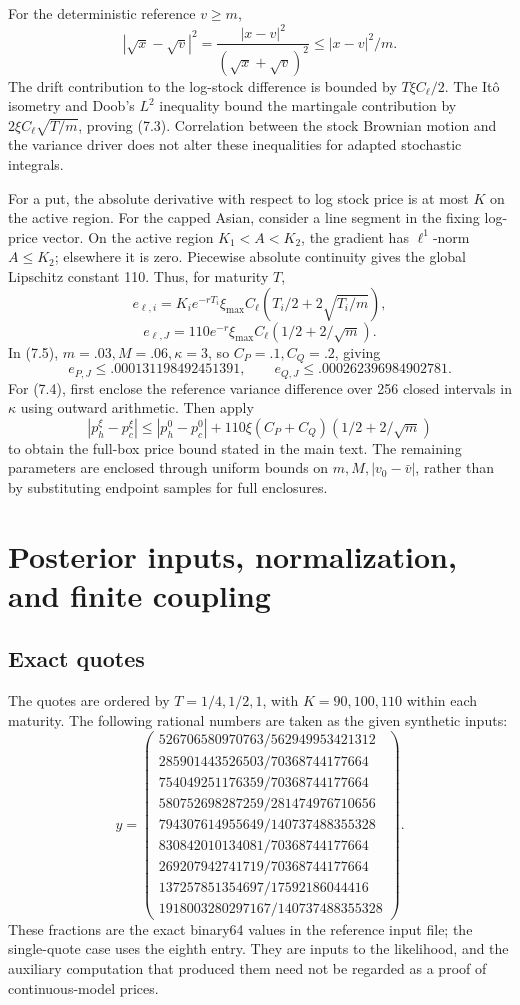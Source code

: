 For the deterministic reference \(v\ge m\),
\[
|\sqrt{x}-\sqrt v|^2
=\frac{|x-v|^2}{(\sqrt x+\sqrt v)^2}\le |x-v|^2/m.
\]
The drift contribution to the log-stock difference is bounded by \(T\xi C_\ell/2\).
The It\^o isometry and Doob's \(L^2\) inequality bound the martingale contribution by
\(2\xi C_\ell\sqrt{T/m}\), proving (7.3).
Correlation between the stock Brownian motion and the variance driver does not alter
these inequalities for adapted stochastic integrals.

For a put, the absolute derivative with respect to log stock price is at most \(K\)
on the active region.
For the capped Asian, consider a line segment in the fixing log-price vector.
On the active region \(K_1<A<K_2\), the gradient has \(\ell^1\)-norm \(A\le K_2\);
elsewhere it is zero.
Piecewise absolute continuity gives the global Lipschitz constant 110.
Thus, for maturity \(T\),
\[
e_{\ell,i}=K_i e^{-rT_i}\xi_{\max}C_\ell
\left(T_i/2+2\sqrt{T_i/m}\right),
\]
\[
e_{\ell,J}=110e^{-r}\xi_{\max}C_\ell
\left(1/2+2/\sqrt m\right).
\tag{E.3}
\]
In (7.5), \(m=.03,M=.06,\kappa=3\), so \(C_P=.1,C_Q=.2\), giving
\[
e_{P,J}\le.000131198492451391,\qquad
e_{Q,J}\le.000262396984902781.
\tag{E.4}
\]
For (7.4), first enclose the reference variance difference over 256 closed intervals
in \(\kappa\) using outward arithmetic. Then apply
\[
|p_h^\xi-p_c^\xi|
\le |p_h^0-p_c^0|+
110\xi(C_P+C_Q)(1/2+2/\sqrt m)
\]
to obtain the full-box price bound stated in the main text.
The remaining parameters are enclosed through uniform bounds on
\(m,M,|v_0-\bar v|\), rather than by substituting endpoint samples for full enclosures.

\section{Posterior inputs, normalization, and finite coupling}

\subsection{Exact quotes}

The quotes are ordered by \(T=1/4,1/2,1\), with \(K=90,100,110\) within each maturity.
The following rational numbers are taken as the given synthetic inputs:
\[
y=\begin{pmatrix}
526706580970763/562949953421312\\
285901443526503/70368744177664\\
754049251176359/70368744177664\\
580752698287259/281474976710656\\
794307614955649/140737488355328\\
830842010134081/70368744177664\\
269207942741719/70368744177664\\
137257851354697/17592186044416\\
1918003280297167/140737488355328
\end{pmatrix}.
\tag{F.1}
\]
These fractions are the exact binary64 values in the reference input file; the single-quote
case uses the eighth entry.
They are inputs to the likelihood, and the auxiliary computation that produced them
need not be regarded as a proof of continuous-model prices.

